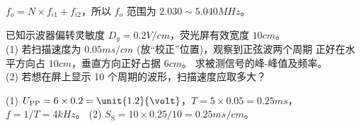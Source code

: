 \documentclass[a4paper,12pt]{examdesign}
\begin{document}
\begin{shortanswer}[title={二、计算题 (每题 10 分，共 80 分)}]
\begin{question}
\begin{figure}[H]
    \end{figure}
    \examvspace*{4cm}
    \begin{answer}
        $f_o = N\times f_{i1}+f_{i2}$，所以 $f_o$ 范围为
        $2.030\sim\unit{5.040}{MHz}$。
    \end{answer}
\end{question}
\begin{question}
    已知示波器偏转灵敏度 $D_y=\unit{0.2}{V/cm}$，荧光屏有效宽度
    $\unit{10}{cm}$。 \\
    (1) 若扫描速度为 $\unit{0.05}{ms/cm}$ (放“校正”位置)，观察到正弦波两个周期
    正好在水平方向占 $\unit{10}{cm}$，垂直方向正好占据 $\unit{6}{cm}$。
    求被测信号的峰-峰值及频率。 \\
    (2) 若想在屏上显示 10 个周期的波形，扫描速度应取多大？
    \examvspace*{0cm}
    \begin{answer}
        (1) $U_\mathrm{PP} = 6 \times 0.2 = \unit{1.2}{\volt}$，$T = 5
        \times 0.05 = \unit{0.25}{ms}$，$f=1/T=\unit{4}{kHz}$。
        (2) $S_\mathrm{S} = 10 \times 0.25 / 10 = \unit{0.25}{ms/cm}$。
    \end{answer}
\end{question}

\end{shortanswer}
\end{document}
